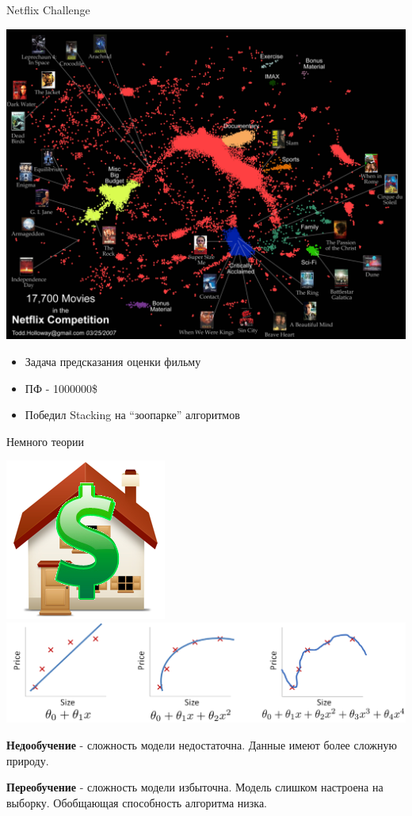 \documentclass[10pt]{beamer}
\begin{document}
\begin{frame}{Netflix Challenge}
\begin{center}
    \includegraphics[scale=0.05]{images/netflix.jpg}
\end{center}
\begin{itemize}
    \item Задача предсказания оценки фильму
    \item ПФ - 1000000\$
    \item Победил Stacking на ``зоопарке'' алгоритмов
\end{itemize}
\end{frame}

\begin{frame}{Немного теории}
    \begin{center}
        \includegraphics[scale=0.2]{images/houseprice.png}\\
        \includegraphics[scale=0.2]{images/linreg.png}
    \end{center}
\textbf{Недообучение} - сложность модели недостаточна. Данные имеют более
сложную природу.

\textbf{Переобучение} - сложность модели избыточна. Модель слишком настроена на
выборку. Обобщающая способность алгоритма низка.
\end{frame}
\end{document}
